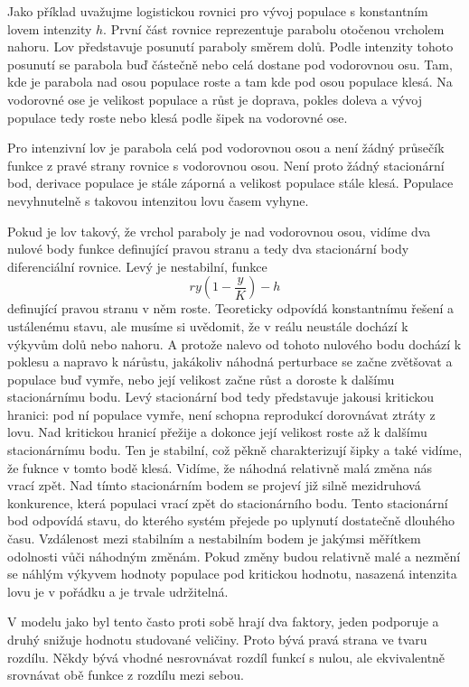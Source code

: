 \documentclass[12pt]{article}
\begin{document}
Jako příklad uvažujme logistickou rovnici pro vývoj populace s konstantním lovem intenzity $h$. První část rovnice reprezentuje parabolu otočenou vrcholem nahoru. Lov představuje posunutí paraboly směrem dolů. Podle intenzity tohoto posunutí se parabola buď částečně nebo celá dostane pod vodorovnou osu. Tam, kde je parabola nad osou populace roste a tam kde pod osou populace klesá. Na vodorovné ose je velikost populace a růst je doprava, pokles doleva a vývoj populace tedy roste nebo klesá podle šipek na vodorovné ose.

Pro intenzivní lov je parabola celá pod vodorovnou osou a není žádný průsečík funkce z pravé strany rovnice s vodorovnou osou. Není proto žádný stacionární bod, derivace populace je stále záporná a velikost populace stále klesá. Populace nevyhnutelně s takovou intenzitou lovu časem vyhyne.

Pokud je lov takový, že vrchol paraboly je nad vodorovnou osou, vidíme dva nulové body funkce definující pravou stranu a tedy dva stacionární body diferenciální rovnice. Levý je nestabilní, funkce $$ry\left(1-\frac yK\right)-h$$ definující pravou stranu v něm roste. Teoreticky odpovídá konstantnímu řešení a ustálenému stavu, ale musíme si uvědomit, že v reálu neustále dochází k výkyvům dolů nebo nahoru. A protože nalevo od tohoto nulového bodu dochází k poklesu a napravo k nárůstu, jakákoliv náhodná perturbace se začne zvětšovat a populace buď vymře, nebo její velikost začne růst a doroste k dalšímu stacionárnímu bodu. Levý stacionární bod tedy představuje jakousi kritickou hranici: pod ní populace vymře, není schopna reprodukcí dorovnávat ztráty z lovu. Nad kritickou hranicí přežije a dokonce její velikost roste až k dalšímu stacionárnímu bodu. Ten je stabilní, což pěkně charakterizují šipky a také vidíme, že fuknce v tomto bodě klesá. Vidíme, že náhodná relativně malá změna nás vrací zpět. Nad tímto stacionárním bodem se projeví již silně mezidruhová konkurence, která populaci vrací zpět do stacionárního bodu. Tento stacionární bod odpovídá stavu, do kterého systém přejede po uplynutí dostatečně dlouhého času. Vzdálenost mezi stabilním a nestabilním bodem je jakýmsi měřítkem odolnosti vůči náhodným změnám. Pokud změny budou relativně malé a nezmění se náhlým výkyvem hodnoty populace pod kritickou hodnotu, nasazená intenzita lovu je v pořádku a je trvale udržitelná. 

V modelu jako byl tento často proti sobě hrají dva faktory, jeden podporuje a druhý snižuje hodnotu studované veličiny. Proto bývá pravá strana ve tvaru rozdílu. Někdy bývá vhodné nesrovnávat rozdíl funkcí s nulou, ale ekvivalentně srovnávat obě funkce z rozdílu mezi sebou. 
\end{document}
